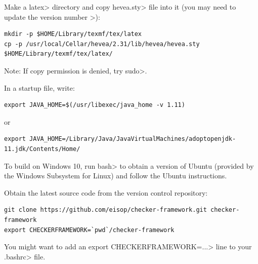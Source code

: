 \begin{description}
Make a \<latex> directory and copy \<hevea.sty> file into it (you may need to update the version number >):

\begin{Verbatim}
mkdir -p $HOME/Library/texmf/tex/latex
cp -p /usr/local/Cellar/hevea/2.31/lib/hevea/hevea.sty $HOME/Library/texmf/tex/latex/
\end{Verbatim}

Note: If copy permission is denied, try \<sudo>.

In a startup file, write:

\begin{Verbatim}
export JAVA_HOME=$(/usr/libexec/java_home -v 1.11)
\end{Verbatim}
or
\begin{Verbatim}
export JAVA_HOME=/Library/Java/JavaVirtualMachines/adoptopenjdk-11.jdk/Contents/Home/
\end{Verbatim}


\item[Windows]
  To build on Windows 10,
  run \<bash> to obtain a version of
  Ubuntu (provided by the Windows Subsystem for Linux) and follow the Ubuntu
  instructions.


\end{description}



Obtain the latest source code from the version control repository:

\begin{Verbatim}
git clone https://github.com/eisop/checker-framework.git checker-framework
export CHECKERFRAMEWORK=`pwd`/checker-framework
\end{Verbatim}

You might want to add an \<export CHECKERFRAMEWORK=...> line to your
\<.bashrc> file.




